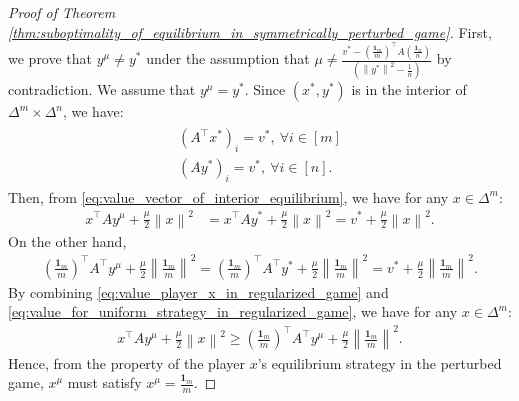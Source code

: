 \documentclass{article}
\newcommand{\bone}{\mathbf{1}}
\theoremstyle{plain}
\begin{document}
\begin{proof}[Proof of Theorem \ref{thm:suboptimality_of_equilibrium_in_symmetrically_perturbed_game}]
    First, we prove that $y^{\mu}\neq y^{\ast}$ under the assumption that $\mu \neq \frac{v^{\ast} - \left(\frac{\bone_m}{m}\right)^{\top}A\left(\frac{\bone_n}{n}\right)}{\left(\left\|y^{\ast}\right\|^2 - \frac{1}{n}\right)}$ by contradiction.
    We assume that $y^{\mu} = y^{\ast}$.
    Since $(x^{\ast}, y^{\ast})$ is in the interior of $\Delta^m \times \Delta^n$, we have:
    \begin{align}
        \begin{aligned}
            (A^{\top}x^{\ast})_i = v^{\ast}, ~\forall i\in [m] \\
            (Ay^{\ast})_i = v^{\ast}, ~\forall i\in [n].
        \end{aligned}
        \label{eq:value_vector_of_interior_equilibrium}
    \end{align}
    Then, from \eqref{eq:value_vector_of_interior_equilibrium}, we have for any $x\in \Delta^m$:
    \begin{align}
        x^{\top}Ay^{\mu} + \frac{\mu}{2} \left\|x\right\|^2 & = x^{\top}Ay^{\ast} + \frac{\mu}{2} \left\|x\right\|^2 = v^{\ast} + \frac{\mu}{2} \left\|x\right\|^2.
        \label{eq:value_player_x_in_regularized_game}
    \end{align}
    On the other hand,
    \begin{align}
        \left(\frac{\bone_m}{m}\right)^{\top}A^{\top}y^{\mu} + \frac{\mu}{2} \left\|\frac{\bone_m}{m}\right\|^2 = \left(\frac{\bone_m}{m}\right)^{\top}A^{\top}y^{\ast} + \frac{\mu}{2} \left\|\frac{\bone_m}{m}\right\|^2 =  v^{\ast} + \frac{\mu}{2} \left\|\frac{\bone_m}{m}\right\|^2.
        \label{eq:value_for_uniform_strategy_in_regularized_game}
    \end{align}
    By combining \eqref{eq:value_player_x_in_regularized_game} and \eqref{eq:value_for_uniform_strategy_in_regularized_game}, we have for any $x\in \Delta^m$:
    \begin{align*}
        x^{\top}Ay^{\mu} + \frac{\mu}{2} \left\|x\right\|^2 \geq \left(\frac{\bone_m}{m}\right)^{\top}A^{\top}y^{\mu} + \frac{\mu}{2} \left\|\frac{\bone_m}{m}\right\|^2.
    \end{align*}
    Hence, from the property of the player $x$'s equilibrium strategy in the perturbed game, $x^{\mu}$ must satisfy $x^{\mu} = \frac{\bone_m}{m}$.


\end{proof}
\end{document}
